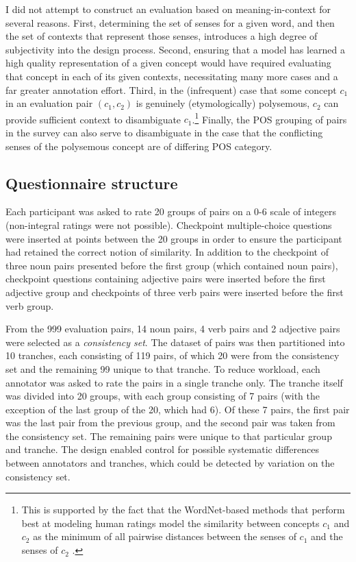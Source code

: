I did not attempt to construct an evaluation based on meaning-in-context for several reasons. First, determining the set of senses for a given word, and then the set of contexts that represent those senses, introduces a high degree of subjectivity into the design process. Second, ensuring that a model has learned a high quality representation of a given concept would have required evaluating that concept in each of its given contexts, necessitating many more cases and a far greater annotation effort. Third, in the (infrequent) case that some concept \(c_1\) in an evaluation pair \((c_1,c_2)\) is genuinely (etymologically) polysemous, \( c_2 \) can provide sufficient context to disambiguate \(c_1\).\footnote{This is supported by the fact that the WordNet-based methods that perform best at modeling human ratings  model the similarity between concepts \( c_1 \) and \( c_2 \) as the minimum of all pairwise distances between the senses of \(c_1\) and the senses of \(c_2\) \cite{resnik1995using,pedersen2004wordnet}.} Finally, the POS grouping of pairs in the survey can also serve to disambiguate in the case that the conflicting senses of the polysemous concept are of differing POS category.

\subsection{Questionnaire structure}

Each participant was asked to rate 20 groups of pairs on a 0-6 scale of integers (non-integral ratings were not possible). Checkpoint multiple-choice questions were inserted at points between the 20 groups in order to ensure the participant had retained the correct notion of similarity. In addition to the checkpoint of three noun pairs presented before the first group (which contained noun pairs), checkpoint questions containing adjective pairs were inserted before the first adjective group and checkpoints of three verb pairs were inserted before the first verb group.     

From the 999 evaluation pairs, 14 noun pairs, 4 verb pairs and 2 adjective pairs were selected as a \emph{consistency set}. The dataset of pairs was then partitioned into 10 tranches, each consisting of 119 pairs, of which 20 were from the consistency set and the remaining 99 unique to that tranche. To reduce workload, each annotator was asked to rate the pairs in a single tranche only. The tranche itself was divided into 20 groups, with each group consisting of 7 pairs (with the exception of the last group of the 20, which had 6). Of these 7 pairs, the first pair was the last pair from the previous group, and the second pair was taken from the consistency set. The remaining pairs were unique to that particular group and tranche. The design enabled control for possible systematic differences between annotators and tranches, which could be detected by variation on the consistency set. 

